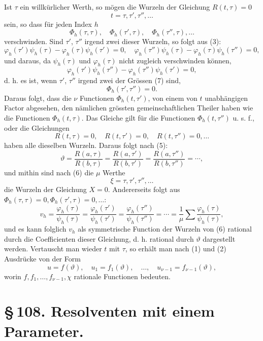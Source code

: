 \documentclass[11pt]{article}
\begin{document}
Ist \(\tau\) ein willkürlicher Werth, so mögen die Wurzeln der Gleichung \(R(t,\tau)=0\)
\begin{equation}
t=\tau,\tau',\tau'',\ldots
\tag{7}
\end{equation}
sein, so dass für jeden Index \(h\)
\[
\Phi_h(\tau,\tau),\quad \Phi_h(\tau',\tau),\quad \Phi_h(\tau'',\tau),\ldots
\]
verschwinden. Sind \(\tau'\), \(\tau''\) irgend zwei dieser Wurzeln, so folgt aus (3):
\[
\varphi_h(\tau')\psi_h(\tau)-\varphi_h(\tau)\psi_h(\tau')=0,
\quad
\varphi_h(\tau'')\psi_h(\tau)-\varphi_h(\tau)\psi_h(\tau'')=0,
\]
und daraus, da \(\psi_h(\tau)\) und \(\varphi_h(\tau)\) nicht zugleich verschwinden können,
\[
\varphi_h(\tau')\psi_h(\tau'')-\varphi_h(\tau'')\psi_h(\tau')=0,
\]
d. h. es ist, wenn \(\tau'\), \(\tau''\) irgend zwei der Grössen (7) sind,
\[
\Phi_h(\tau',\tau'')=0.
\]
Daraus folgt, dass die \(\nu\) Functionen \(\Phi_h(t,\tau')\), von einem von \(t\) unabhängigen Factor abgesehen, den nämlichen grössten gemeinschaftlichen Theiler haben wie die Functionen \(\Phi_h(t,\tau)\). Das Gleiche gilt für die Functionen \(\Phi_h(t,\tau'')\) u. s. f., oder die Gleichungen
\[
R(t,\tau)=0,\quad R(t,\tau')=0,\quad R(t,\tau'')=0,\ldots
\]
haben alle dieselben Wurzeln. Daraus folgt nach (5):
\[
\vartheta=
\frac{R(a,\tau)}{R(b,\tau)}
=
\frac{R(a,\tau')}{R(b,\tau')}
=
\frac{R(a,\tau'')}{R(b,\tau'')}=\cdots,
\]
und mithin sind nach (6) die \(\mu\) Werthe
\[
\xi=\tau,\tau',\tau'',\ldots
\]
die Wurzeln der Gleichung \(X=0\). Andererseits folgt aus \(\Phi_h(\tau,\tau)=0,\Phi_h(\tau',\tau)=0,\ldots\):
\[
v_h=\frac{\varphi_h(\tau)}{\psi_h(\tau)}
=
\frac{\varphi_h(\tau')}{\psi_h(\tau')}
=
\frac{\varphi_h(\tau'')}{\psi_h(\tau'')}
=
\cdots
=
\frac1\mu\sum\frac{\varphi_h(\tau)}{\psi_h(\tau)},
\]
und es kann folglich \(v_h\) als symmetrische Function der Wurzeln von (6) rational durch die Coefficienten dieser Gleichung, d. h. rational durch \(\vartheta\) dargestellt werden. Vertauscht man wieder \(t\) mit \(\tau\), so erhält man nach (1) und (2) Ausdrücke von der Form
\begin{equation}
u=f(\vartheta),\quad
u_1=f_1(\vartheta),\quad\ldots,\quad
u_{\nu-1}=f_{\nu-1}(\vartheta),
\tag{10}
\end{equation}
worin \(f,f_1,\ldots,f_{\nu-1},\chi\) rationale Functionen bedeuten.

\section*{\S\,108. Resolventen mit einem Parameter.}
\end{document}
